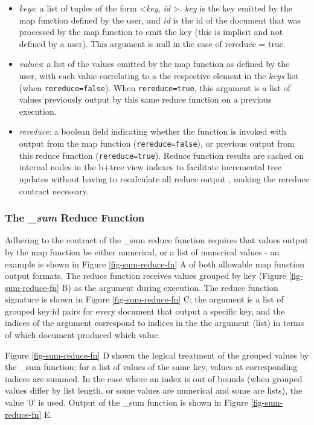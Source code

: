 \begin{itemize}
    \item \textit{keys}: a list of tuples of the form \textless \textit{key}, \textit{id} \textgreater. \textit{key} is the key emitted by the map function defined by the user, and \textit{id} is the id of the document that was processed by the map function to emit the key (this is implicit and not defined by a user). This argument is null in the case of rereduce = true.
    \item \textit{values}: a list of the values emitted by the map function as defined by the user, with each value correlating to a the respective element in the \textit{keys} list (when \texttt{rereduce=false}). When \texttt{rereduce=true}, this argument is a list of values previously output by this same reduce function on a previous execution.
    \item \textit{rereduce}: a boolean field indicating whether the function is invoked with output from the map function (\texttt{rereduce=false}), or previous output from this reduce function (\texttt{rereduce=true}). Reduce function results are cached on internal nodes in the b+tree view indexes to facilitate incremental tree updates without having to recalculate all reduce output \cite{slack25Oct}, making the rereduce contract necessary.
\end{itemize}

\subsubsection{The \textit{\_sum} Reduce Function}
Adhering to the contract of the \_sum reduce function requires that values output by the map function be either numerical, or a list of numerical values - an example is shown in Figure \ref{fig-sum-reduce-fn} A of both allowable map function output formats. The reduce function receives values grouped by key (Figure \ref{fig-sum-reduce-fn} B) as the  argument during execution. The reduce function signature is shown in Figure \ref{fig-sum-reduce-fn} C; the  argument is a list of grouped key:id pairs for every document that output a specific key, and the indices of the  argument correspond to indices in the the  argument (list) in terms of which document produced which value.

Figure \ref{fig-sum-reduce-fn} D shown the logical treatment of the grouped values by the \_sum function; for a list of values of the same key, values at corresponding indices are summed. In the case where an index is out of bounds (when grouped values differ by list length, or some values are numerical and some are lists), the value '0' is used. Output of the \_sum function is shown in Figure \ref{fig-sum-reduce-fn} E.

